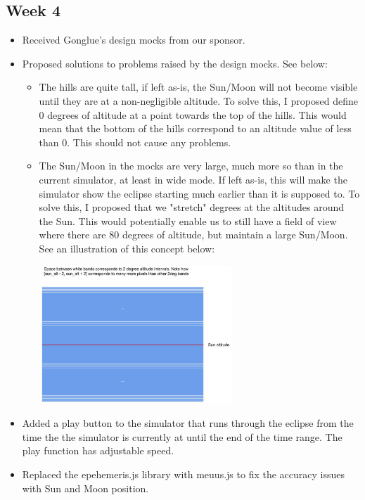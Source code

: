 \documentclass[10pt, onecolumn, draftclsnofoot, letterpaper, compsoc]{IEEEtran}
\begin{document}
\subsection{Week 4}

    \begin{itemize}

    \item Received Gonglue's design mocks from our sponsor.

	\item Proposed solutions to problems raised by the design mocks. See below:

		\begin{itemize}

		\item The hills are quite tall, if left as-is, the Sun/Moon will not become
			  visible until they are at a non-negligible altitude. To solve this,
			  I proposed define 0 degrees of altitude at a point towards the top of the
			  hills. This would mean that the bottom of the hills correspond to an altitude
			  value of less than 0. This should not cause any problems.

		\item The Sun/Moon in the mocks are very large, much more so than in the current
			  simulator, at least in wide mode. If left as-is, this will make the simulator
			  show the eclipse starting much earlier than it is supposed to. To solve this, I
			  proposed that we "stretch" degrees at the altitudes around the Sun. This would
			  potentially enable us to still have a field of view where there are 80 degrees
			  of altitude, but maintain a large Sun/Moon. See an illustration of this concept below:

			  \begin{center}
			  	\includegraphics[width=0.6\textwidth]{angle.eps}
			  \end{center}

		\end{itemize}

    \item Added a play button to the simulator that runs through the eclipse from the time the
          the simulator is currently at until the end of the time range. The play function has
          adjustable speed.

    \item Replaced the epehemeris.js library with meuus.js to fix the accuracy issues with Sun and
          Moon position.

    \end{itemize}
\end{document}
